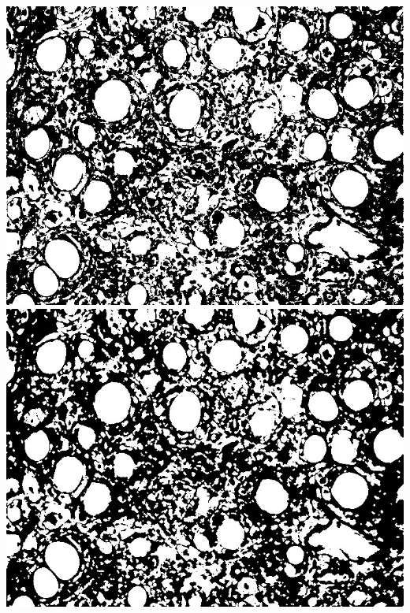 \documentclass[a4paper]{article}
\begin{document}
\noindent
\begin{minipage}{0.24\textwidth}
    \centering
    \includegraphics[width=\textwidth]{../code/task1/output/kernel_size_1.jpg}
    \includegraphics[width=\textwidth]{../code/task1/output/kernel_size_3.jpg}
\end{minipage}
\hfill
\end{document}
